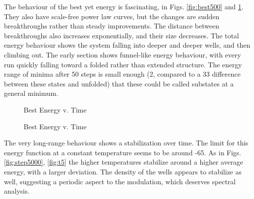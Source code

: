 \documentclass{article}
\begin{document}
	The behaviour of the best yet energy is fascinating, in Figs. \ref{fig:best500} and \ref{fig:best1000}. They also have scale-free power law curves, but the changes are sudden breakthroughs rather than steady improvements. The distance between breakthroughs also increases exponentially, and their size decreases. The total energy behaviour shows the system falling into deeper and deeper wells, and then climbing out. The early section shows funnel-like energy behaviour, with every run quickly falling toward a folded rather than extended structure. The energy range of minima after 50 steps is small enough (2, compared to a 33 difference between these states and unfolded) that these could be called substates at a general minimum.

	\begin{figure}[h]
	  \begin{floatrow}
	    {\caption{Best Energy v. Time}
	  \label{fig:best500}}
	  {\caption{Best Energy v. Time}
	  \label{fig:best1000}}
	  \end{floatrow}
	\end{figure}
	

	The very long-range behaviour shows a stabilization over time. The limit for this energy function at a constant temperature seems to be around -65. As in Figs. \ref{fig:step5000}, \ref{fig:t5} the higher temperatures stabilize around a higher average energy, with a larger deviation. The density of the wells appears to stabilize as well, suggesting a periodic aspect to the modulation, which deserves spectral analysis.
\end{document}
